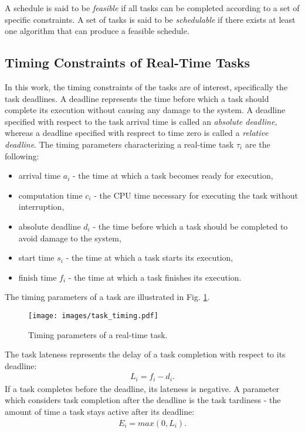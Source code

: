A schedule is said to be \textit{feasible} if all tasks can be completed according to a set of specific constraints.
A set of tasks is said to be \textit{schedulable} if there exists at least one algorithm that can produce a feasible schedule.

\subsection{Timing Constraints of Real-Time Tasks}
In this work, the timing constraints of the tasks are of interest, specifically the task deadlines.
A deadline represents the time before which a task should complete its execution without causing any damage to the system.
A deadline specified with respect to the task arrival time is called an \textit{absolute deadline}, whereas a deadline specified with resprect to time zero is called a \textit{relative deadline}.
The timing parameters characterizing a real-time task $\tau_i$ are the following:
\begin{itemize}
    \item arrival time $a_i$ - the time at which a task becomes ready for execution,
    \item computation time $c_i$ - the CPU time necessary for executing the task without interruption,
    \item absolute deadline $d_i$ - the time before which a task should be completed to avoid damage to the system,
    \item start time $s_i$ - the time at which a task starts its execution,
    \item finish time $f_i$ - the time at which a task finishes its execution.
\end{itemize}
The timing parameters of a task are illustrated in Fig. \ref{task_timing}.
\begin{figure}[ht]
    \centering
    \texttt{[image: images/task\_timing.pdf]}
    \caption{Timing parameters of a real-time task.}
    \label{task_timing}
\end{figure}
The task lateness represents the delay of a task completion with respect to its deadline:
\begin{align*}
L_i = f_i - d_i.
\end{align*}
If a task completes before the deadline, its lateness is negative.
A parameter which considers task completion after the deadline is the task tardiness - the amount of time a task stays active after its deadline:
\begin{align*}
E_i = max( 0, L_i ).
\end{align*}

